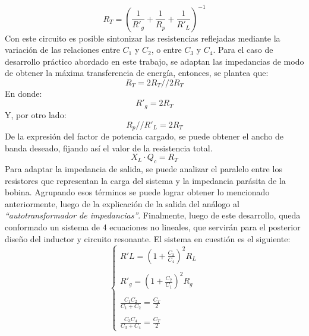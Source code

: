 \documentclass{article}
\begin{document}
\begin{equation*}
    R_T = \left( \frac{1}{R'_g} + \frac{1}{R_p} + \frac{1}{R'_L}\right) ^{-1}
\end{equation*}
\noindent Con este circuito es posible sintonizar las resistencias reflejadas mediante la variación de las relaciones entre $C_1$ y $C_2$, o entre $C_3$ y $C_4$. 
Para el caso de desarrollo práctico abordado en este trabajo, se adaptan las impedancias de modo de obtener la máxima transferencia de energía, entonces, se plantea que:
\begin{equation*}
    R_T = 2 R_T // 2 R_T
\end{equation*}
\noindent En donde: 
\begin{equation*}
    R'_g = 2 R_T
\end{equation*}
\noindent Y, por otro lado:
\begin{equation*}
    R_p // R'_L = 2R_T
\end{equation*}
\noindent De la expresión del factor de potencia cargado, se puede obtener el ancho de banda deseado, fijando así el valor de la resistencia total.
\begin{equation*}
    X_L \cdot Q_c = R_T 
\end{equation*}
\noindent Para adaptar la impedancia de salida, se puede analizar el paralelo entre los resistores que representan la carga del sistema y la impedancia parásita de la bobina. Agrupando esos términos se puede lograr obtener lo mencionado anteriormente, luego de la explicación de la salida del análogo al \textit{“autotransformador de impedancias”}.
Finalmente, luego de este desarrollo, queda conformado un sistema de 4 ecuaciones no lineales, que servirán para el posterior diseño del inductor y circuito resonante. El sistema en cuestión es el siguiente:
\begin{equation*}
    \begin{cases}
        R'L = \left( 1 + \frac{C_3}{C_4} \right)^2 R_L \\
        \\
        R'_g = \left( 1 + \frac{C_2}{C_1} \right)^2 R_g \\
        \\
        \frac{C_1 C_2}{C_1 + C_2} = \frac{C_T}{2} \\
        \\
        \frac{C_3 C_4}{C_3 + C_4}= \frac{C_T}{2}
    \end{cases}
\end{equation*} 
\end{document}

